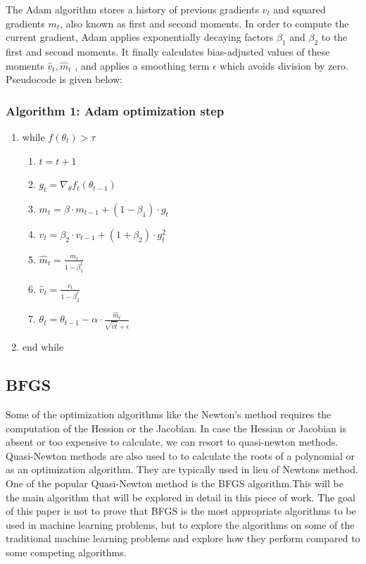 \documentclass[10pt,twocolumn]{article}
\begin{document}
The Adam algorithm stores a history of previous gradients $v_t$ and squared gradients $m_t$, also known as first and second moments. In order to compute the current gradient, Adam applies exponentially decaying factors $ \beta_1$ and $\beta_2$ to the first and second moments. It finally calculates bias-adjusted values of these moments $\hat{v}_t , \hat{m}_t $ , and applies a smoothing term $\epsilon$ which avoids division by zero. Pseudocode is given below:

\subsubsection{Algorithm 1: Adam optimization step}
\begin{enumerate}
\item while  $ f ( \theta_t ) > \tau $ 
	\begin{enumerate}
	\item$ t = t + 1 $
	\item$g_t = \nabla_{\theta} f_t (\theta_{t-1})$
	\item$ m_t = \beta \cdot m_{t-1} + (1-\beta_1) \cdot g_t  $
	\item$ v_t = \beta_2 \cdot v_{t-1} + (1+\beta_2) \cdot g_t^2  $
	\item$\hat{m}_t =\frac{m_t}{1-\beta_1^t}  $
	\item$\hat{v}_t = \frac{v_t}{1-\beta_2^t}  $
	\item$ \theta_t = \theta_{t-1} - \alpha \cdot  \frac{{\hat{m}_t}}{\sqrt{\hat{vt}} + \epsilon} $
	\end{enumerate}
\item end while
\end{enumerate}

\subsection{BFGS}
Some of the optimization algorithms like the Newton's method requires the computation of the Hession or the Jacobian. In case the Hessian or Jacobian is absent or too expensive to calculate, we can resort to quasi-newton methods. Quasi-Newton methods are also used to to calculate the roots of a polynomial or as an optimization algorithm. They are typically used in lieu of Newtons method. One of the popular Quasi-Newton method is the BFGS algorithm\cite{bonnans2006numerical}.This will be the main algorithm that will be explored in detail in this piece of work. The goal of this paper is not to prove that BFGS is the most appropriate algorithms to be used in machine learning problems, but to explore the algorithms on some of the traditional machine learning problems and explore how they perform compared to some competing algorithms. 
\end{document}
